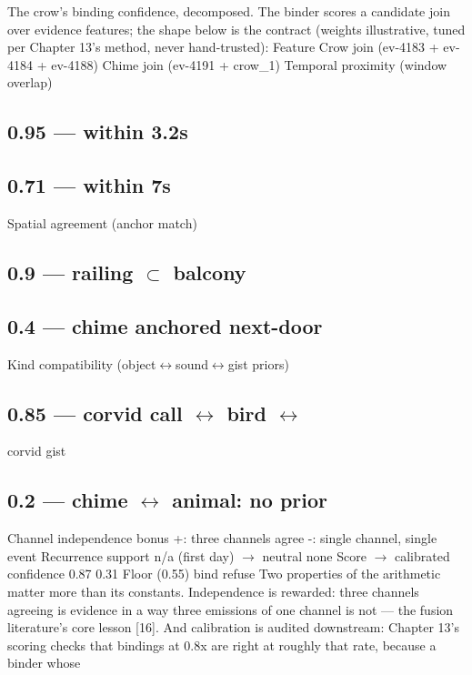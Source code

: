 The crow's binding confidence, decomposed. The binder scores a candidate join over evidence features; the shape below is the contract (weights illustrative, tuned per Chapter 13's method, never hand-trusted): Feature Crow join (ev-4183 + ev-4184 + ev-4188) Chime join (ev-4191 + crow\_1) Temporal proximity (window overlap)

\subsection{0.95 --- within 3.2s}\label{within-3.2s}

\subsection{0.71 --- within 7s}\label{within-7s}

Spatial agreement (anchor match)

\subsection{\texorpdfstring{0.9 --- railing \(\subset\) balcony}{0.9 --- railing \textbackslash subset balcony}}\label{railing-subset-balcony}

\subsection{0.4 --- chime anchored next-door}\label{chime-anchored-next-door}

Kind compatibility (object\(\leftrightarrow\)sound\(\leftrightarrow\)gist priors)

\subsection{\texorpdfstring{0.85 --- corvid call \(\leftrightarrow\) bird \(\leftrightarrow\)}{0.85 --- corvid call \textbackslash leftrightarrow bird \textbackslash leftrightarrow}}\label{corvid-call-leftrightarrow-bird-leftrightarrow}

corvid gist

\subsection{\texorpdfstring{0.2 --- chime \(\leftrightarrow\) animal: no prior}{0.2 --- chime \textbackslash leftrightarrow animal: no prior}}\label{chime-leftrightarrow-animal-no-prior}

Channel independence bonus +: three channels agree -: single channel, single event Recurrence support n/a (first day) \(\rightarrow\) neutral none Score \(\rightarrow\) calibrated confidence 0.87 0.31 Floor (0.55) bind refuse Two properties of the arithmetic matter more than its constants. Independence is rewarded: three channels agreeing is evidence in a way three emissions of one channel is not --- the fusion literature's core lesson {[}16{]}. And calibration is audited downstream: Chapter 13's scoring checks that bindings at 0.8x are right at roughly that rate, because a binder whose

